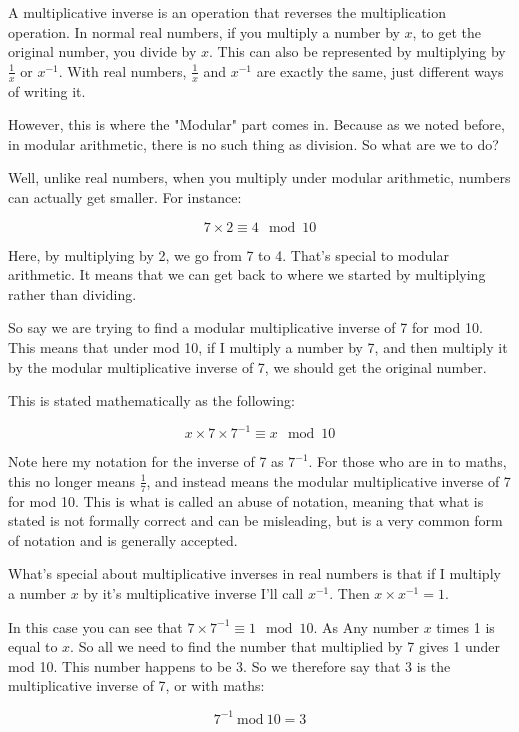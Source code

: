 \documentclass{article}
\newcommand{\inmod}{\ \text{mod}\ }
\begin{document}
  A multiplicative inverse is an operation that reverses the multiplication
  operation. In normal real numbers, if you multiply a number by $x$, to get the
  original number, you divide by $x$. This can also be represented by multiplying
  by $\frac{1}{x}$ or $x^{-1}$. With real numbers, $\frac{1}{x}$ and $x^{-1}$ are exactly the same,
  just different ways of writing it.

  However, this is where the "Modular" part comes in. Because as we noted before,
  in modular arithmetic, there is no such thing as division. So what are we to do?

  Well, unlike real numbers, when you multiply under modular arithmetic, numbers
  can actually get smaller. For instance:

  \[ 7 \times 2 \equiv 4 \mod 10 \]

  Here, by multiplying by 2, we go from 7 to 4. That's special to modular arithmetic.
  It means that we can get back to where we started by multiplying rather than
  dividing.

  So say we are trying to find a modular multiplicative inverse of 7 for mod 10.
  This means that under mod 10, if I multiply a number by 7, and then multiply it
  by the modular multiplicative inverse of 7, we should get the original number.

  This is stated mathematically as the following:

  \[ x \times 7 \times 7^{-1} \equiv x \mod 10 \]

  Note here my notation for the inverse of 7 as $7^{-1}$. For those who are in
  to maths, this no longer means $\frac{1}{7}$, and instead means the modular
  multiplicative inverse of 7 for mod 10. This is what is called an abuse of
  notation, meaning that what is stated is not formally correct and can be
  misleading, but is a very common form of notation and is generally accepted.

  What's special about multiplicative inverses in real numbers is that if I multiply
  a number $x$ by it's multiplicative inverse I'll call $x^{-1}$. Then $x \times x^{-1} = 1$.

  In this case you can see that $7 \times 7^{-1} \equiv 1 \mod 10$. As
  Any number $x$ times 1 is equal to $x$. So all we need to find the number that
  multiplied by 7 gives 1 under mod 10. This number happens to be 3. So we
  therefore say that 3 is the multiplicative inverse of 7, or with maths:

  \[ 7^{-1} \inmod 10 = 3 \]
\end{document}
